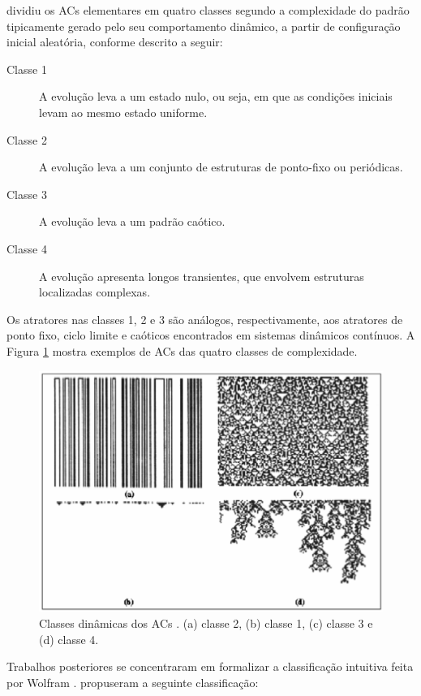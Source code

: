\documentclass[12pt,a4paper]{article}
\begin{document}
 dividiu os ACs elementares em quatro
classes segundo a complexidade do padrão tipicamente gerado pelo seu comportamento dinâmico,
a partir de configuração inicial aleatória, conforme descrito a seguir:

\begin{description}
\item[Classe 1] A evolução leva a um estado nulo, ou seja, em que as condições
iniciais levam ao mesmo estado uniforme.
\item[Classe 2] A evolução leva a um conjunto de estruturas de ponto-fixo ou periódicas.
\item[Classe 3] A evolução leva a um padrão caótico.
\item[Classe 4] A evolução apresenta longos transientes, que envolvem estruturas localizadas complexas.
\end{description}

Os atratores nas classes 1, 2 e 3 são análogos, respectivamente, aos atratores
de ponto fixo, ciclo limite e caóticos encontrados em sistemas dinâmicos
contínuos. A Figura \ref{fig:classes} mostra exemplos de ACs
das quatro classes de complexidade.

\begin{figure}[htp]
\begin{center}
\includegraphics[scale=0.5]{img/classes.eps}
\caption[Classes dinâmicas dos ACs]{Classes dinâmicas dos ACs .
(a) classe 2, (b) classe 1, (c) classe 3 e (d) classe 4.}
\label{fig:classes}
\end{center}
\end{figure}

Trabalhos posteriores se concentraram em formalizar a classificação intuitiva
feita por Wolfram .  propuseram a seguinte
classificação:
\end{document}
